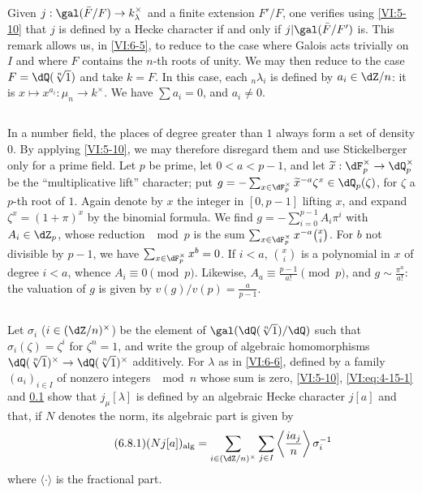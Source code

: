 \documentclass[oneside]{book}
\begin{document}
Given $j:\gal(\bar F/F) \to k_\lambda^\times$ and a finite extension 
$F'/F$, one verifies using \ref{VI:5-10} that $j$ is defined by a 
Hecke character if and only if $j|\gal(\bar F/F')$ is. This 
remark allows us, in \ref{VI:6-5}, to reduce to the case where Galois acts 
trivially on $I$ and where $F$ contains the $n$-th roots of 
unity. We may then reduce to the case $F=\dQ(\sqrt[n]{1})$ and 
take $k=F$. In this case, each $_n \lambda_i$ is defined by 
$a_i\in \dZ/n$: it is $x\mapsto x^{a_i}:\mu_n \to k^\times$. We have 
$\sum a_i=0$, and $a_i\ne 0$. 





\subsection{}\label{VI:6-7}

In a number field, the places of degree greater than $1$ always form a 
set of density $0$. By applying \ref{VI:5-10}, we may therefore disregard 
them and use Stickelberger only for a prime field. Let 
$p$ be prime, let $0<a<p-1$, and let $\widetilde x:\dF_p^\times \to \dQ_p^\times$ be the 
``multiplicative lift'' character; put 
  $g=-\sum_{x\in \dF_p^\times} \widetilde x^{-a} \zeta^x\in \dQ_p(\zeta)$, for 
$\zeta$ a $p$-th root of $1$. Again denote by $x$ the integer in $[0,p-1]$ 
  lifting $x$, and expand $\zeta^x=(1+\pi)^x$ by the binomial formula. 
  We find $g=-\sum_{i=0}^{p-1} A_i\pi^i$ with $A_i\in \dZ_p$, whose reduction 
$\mod p$ is the sum $\sum_{x\in \dF_p^\times} x^{-a} \binom x i$. For $b$ not 
divisible by $p-1$, we have $\sum_{x\in \dF_p^\times} x^b=0$. If $i<a$, 
$\binom x i$ is a polynomial in $x$ of degree $i<a$, whence 
$A_i\equiv 0\pmod p$. Likewise, $A_a\equiv \frac{p-1}{a!} \pmod p$, and 
$g\sim \frac{\pi^a}{a!}$: the valuation of $g$ is given by 
$v(g)/v(p) = \frac{a}{p-1}$. 





\subsection{}\label{VI:6-8}

Let $\sigma_i$ ($i\in (\dZ/n)^\times$) be the element of 
$\gal(\dQ(\sqrt[n]{1})/\dQ)$ such that $\sigma_i(\zeta)=\zeta^i$ for $\zeta^n=1$, 
and write the group of algebraic homomorphisms 
$\dQ(\sqrt[n]{1})^\times \to \dQ(\sqrt[n]{1})^\times$ additively. For $\lambda$ as in 
\ref{VI:6-6}, defined by a family 
$(a_i)_{i\in I}$ of nonzero integers $\mod n$ whose sum is zero, 
\ref{VI:5-10}, \eqref{VI:eq:4-15-1} and \ref{VI:6-7} 
show that $j_\mu[\lambda]$ is defined by an algebraic Hecke character 
$j[a]$ and that, if $N$ denotes the norm, its algebraic part is 
given by 
\begin{equation*}\tag{6.8.1}\label{VI:eq:6-8-1}
  (N j[a])_\text{alg} = \sum_{i\in (\dZ/n)^\times} \sum_{j\in I} \left\langle \frac{i a_j}{n} \right\rangle \sigma_i^{-1} 
\end{equation*}
  where $\langle \cdot \rangle$ is the fractional part. 
\end{document}
